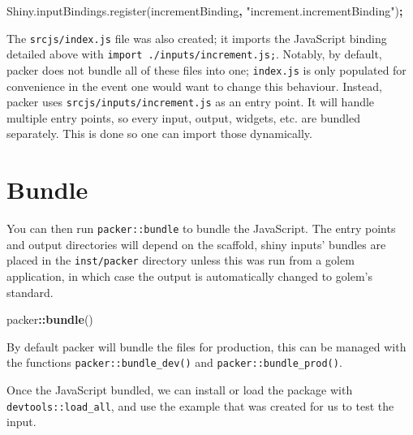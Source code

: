 \documentclass[
]{krantz}
\makeatletter
\newenvironment{Shaded}{\begin{snugshade}}{\end{snugshade}}
\newcommand{\AttributeTok}[1]{\textcolor[rgb]{0.61,0.61,0.61}{#1}}
\newcommand{\KeywordTok}[1]{\textcolor[rgb]{0.27,0.27,0.27}{\textbf{#1}}}
\newcommand{\NormalTok}[1]{#1}
\newcommand{\OperatorTok}[1]{\textcolor[rgb]{0.43,0.43,0.43}{\textbf{#1}}}
\newcommand{\StringTok}[1]{\textcolor[rgb]{0.5,0.5,0.5}{#1}}
\newcommand{\VariableTok}[1]{\textcolor[rgb]{0,0,0}{#1}}
\newenvironment{kframe}{%
\medskip{}
\setlength{\fboxsep}{.8em}
 \def\at@end@of@kframe{}%
 \ifinner\ifhmode%
  \def\at@end@of@kframe{\end{minipage}}%
  \begin{minipage}{\columnwidth}%
 \fi\fi%
 \def\FrameCommand##1{\hskip\@totalleftmargin \hskip-\fboxsep
 \colorbox{shadecolor}{##1}\hskip-\fboxsep
     \hskip-\linewidth \hskip-\@totalleftmargin \hskip\columnwidth}%
 \MakeFramed {\advance\hsize-\width
   \@totalleftmargin\z@ \linewidth\hsize
   \@setminipage}}%
 {\par\unskip\endMakeFramed%
 \at@end@of@kframe}
\renewenvironment{Shaded}{\begin{kframe}}{\end{kframe}}
\makeatother
\begin{document}
\begin{Shaded}
\begin{Highlighting}[]
\VariableTok{Shiny}\NormalTok{.}\VariableTok{inputBindings}\NormalTok{.}\AttributeTok{register}\NormalTok{(incrementBinding}\OperatorTok{,} \StringTok{"increment.incrementBinding"}\NormalTok{)}\OperatorTok{;}
\end{Highlighting}
\end{Shaded}

The \texttt{srcjs/index.js} file was also created; it imports the JavaScript binding detailed above with \texttt{import\ \textquotesingle{}./inputs/increment.js\textquotesingle{};}. Notably, by default, packer does not bundle all of these files into one; \texttt{index.js} is only populated for convenience in the event one would want to change this behaviour. Instead, packer uses \texttt{srcjs/inputs/increment.js} as an entry point. It will handle multiple entry points, so every input, output, widgets, etc. are bundled separately. This is done so one can import those dynamically.

\hypertarget{packer-bundle}{%
\section{Bundle}\label{packer-bundle}}

You can then run \texttt{packer::bundle} to bundle the JavaScript. The entry points and output directories will depend on the scaffold, shiny inputs' bundles are placed in the \texttt{inst/packer} directory unless this was run from a golem application, in which case the output is automatically changed to golem's standard.

\begin{Shaded}
\begin{Highlighting}[]
\NormalTok{packer}\OperatorTok{::}\KeywordTok{bundle}\NormalTok{()}
\end{Highlighting}
\end{Shaded}

By default packer will bundle the files for production, this can be managed with the functions \texttt{packer::bundle\_dev()} and \texttt{packer::bundle\_prod()}.

Once the JavaScript bundled, we can install or load the package with \texttt{devtools::load\_all}, and use the example that was created for us to test the input.
\end{document}
